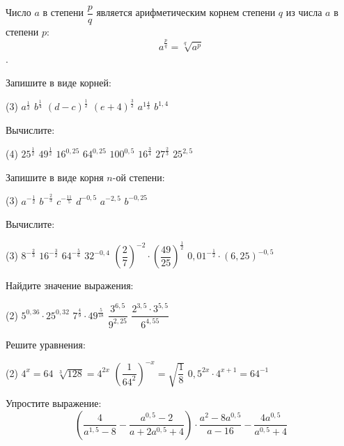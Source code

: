 \begin{class}[number=3]
	\begin{definit}
		Число \(a\) в степени \(\dfrac{p}{q}\) является арифметическим корнем степени \(q\) из числа \(a\) в степени \(p\): \[ a^{\frac{p}{q}}=\sqrt[q]{a^p} \].
	\end{definit}
	\begin{listofex}
		\item Запишите в виде корней:
		\begin{tasks}(3)
			\task \( a^{\tfrac{1}{2}} \)
			\task \( b^{\tfrac{1}{4}} \)
			\task \( (d-c)^{\tfrac{1}{2}} \)
			\task \( (e+4)^{\tfrac{3}{2}} \)
			\task \( a^{1\tfrac{4}{3}} \)
			\task \( b^{1,4} \)
		\end{tasks}
		\item Вычислите:
		\begin{tasks}(4)
			\task \( 25^{\tfrac{1}{2}} \)
			\task \( 49^{\tfrac{1}{2}} \)
			\task \( 16^{0,25} \)
			\task \( 64^{0,25} \)
			\task \( 100^{0,5} \)
			\task \( 16^{\tfrac{3}{4}} \)
			\task \( 27^{\tfrac{2}{3}} \)
			\task \( 25^{2,5} \)
		\end{tasks}
		\item Запишите в виде корня \(n\)-ой степени:
		\begin{tasks}(3)
			\task \( a^{-\tfrac{1}{2}} \)
			\task \( b^{-\tfrac{2}{3}} \)
			\task \( c^{-\tfrac{11}{5}} \)
			\task \( d^{-0,5} \)
			\task \( a^{-2,5} \)
			\task \( b^{-0,25} \)
		\end{tasks}
		\item Вычислите:
		\begin{tasks}(3)
			\task \( 8^{-\tfrac{2}{3}} \)
			\task \( 16^{-\tfrac{3}{2}} \)
			\task \( 64^{-\tfrac{5}{6}} \)
			\task \( 32^{-0,4} \)
			\task \( \left( \dfrac{2}{7}\right)^{-2} \cdot \left( \dfrac{49}{25} \right)^{\tfrac{1}{2}} \)
			\task \( 0,01^{-\tfrac{1}{2}} \cdot (6,25)^{-0,5} \)
		\end{tasks}
		\item Найдите значение выражения:
		\begin{tasks}(2)
			\task \( 5^{0,36} \cdot 25^{0,32} \)
			\task \( 7^{\tfrac{4}{9}} \cdot 49^{\tfrac{5}{18}} \)
			\task \( \dfrac{3^{6,5}}{9^{2,25}} \)
			\task \( \dfrac{2^{3,5}\cdot3^{5,5}}{6^{4,55}} \)
		\end{tasks}
		\item Решите уравнения:
		\begin{tasks}(2)
			\task \( 4^x=64 \)
			\task \( \sqrt[3]{128}=4^{2x} \)
			\task \( \left( \dfrac{1}{64^2} \right)^{-x}=\sqrt{\dfrac{1}{8}} \)
			\task \( 0,5^{2x}\cdot 4^{x+1}=64^{-1} \)
		\end{tasks}
		\item Упростите выражение: \[   \left( \dfrac{4}{a^{1,5}-8} - \dfrac{a^{0,5}-2}{a+2a^{0,5}+4} \right) \cdot \dfrac{a^2-8a^{0,5}}{a-16} - \dfrac{4a^{0,5}}{a^{0,5}+4} \]


\end{listofex}
\end{class}
